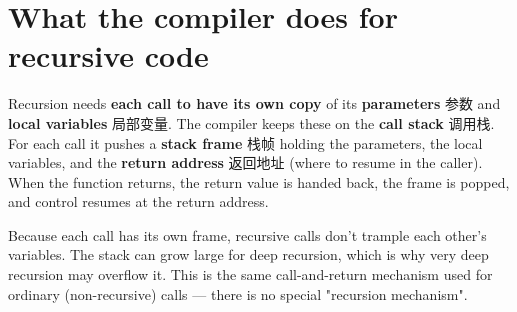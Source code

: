 \documentclass[11pt]{article}
\begin{document}
\section*{What the compiler does for recursive code}

Recursion needs \textbf{each call to have its own copy} of its \textbf{parameters} 参数 and \textbf{local variables} 局部变量. The compiler keeps these on the \textbf{call stack} 调用栈. For each call it pushes a \textbf{stack frame} 栈帧 holding the parameters, the local variables, and the \textbf{return address} 返回地址 (where to resume in the caller). When the function returns, the return value is handed back, the frame is popped, and control resumes at the return address.

Because each call has its own frame, recursive calls don't trample each other's variables. The stack can grow large for deep recursion, which is why very deep recursion may overflow it. This is the same call-and-return mechanism used for ordinary (non-recursive) calls — there is no special "recursion mechanism".
\end{document}
